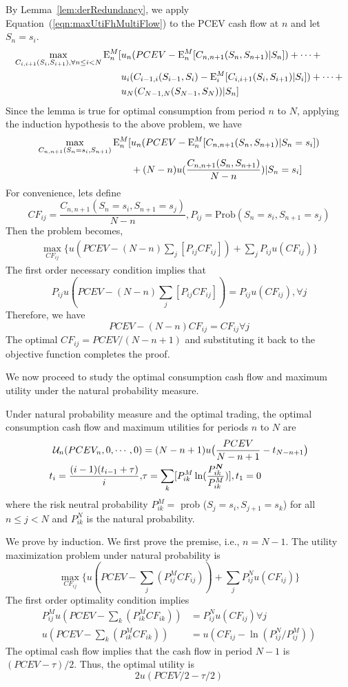 By Lemma~\ref{lem:derRedundancy}, we apply Equation~(\ref{eqn:maxUtiFhMultiFlow}) to the PCEV cash flow at $n$ and let $S_n = s_i$.
\begin{align*}
\max_{C_{i,i+1}(S_i,S_{i+1}), \forall n \leq i < N} \mathrm{E}_{n}^M[ &u_{n} (PCEV - \mathrm{E}_{n}^M[C_{n,n+1}(S_{n},S_{n+1})|S_{n}]) +\cdots+ \\
& u_i( C_{i-1,i}(S_{i-1},S_i) - \mathrm{E}_{i}^M[C_{i,i+1}(S_{i},S_{i+1})|S_i]) + \cdots +  \\
&u_N(C_{N-1,N}(S_{N-1},S_N))|S_n]
\end{align*}
Since the lemma is true for optimal consumption from period $n$ to $N$, applying the induction hypothesis to the above problem, we have
\begin{align*}
\max_{C_{n,n+1}(S_n=s_i,S_{n+1})} \mathrm{E}_{n}^M[ &u_{n} (PCEV - \mathrm{E}_{n}^M[C_{n,n+1}(S_{n},S_{n+1})|S_{n}=s_i]) \\& + (N-n) u(\frac{C_{n,n+1}(S_n,S_{n+1})}{N-n})|S_n=s_i]
\end{align*}
For convenience, lets define
\[ CF_{ij} = \frac{C_{n,n+1}(S_n=s_i,S_{n+1}=s_j)}{N-n}, P_{ij} = \text{Prob} (S_n=s_i,S_{n+1}=s_j)\]
Then the problem becomes,
\begin{align*}
\max_{CF_{ij}} \{u(PCEV-(N-n)\sum_{j} [P_{ij}CF_{ij}]) + \sum_{j} P_{ij}u(CF_{ij}) \}
\end{align*}
The first order necessary condition implies that
\[P_{ij} u(PCEV-(N-n)\sum_{j} [P_{ij}CF_{ij}]) = P_{ij}u(CF_{ij}), \forall j \]
Therefore, we have
\[PCEV - (N-n) CF_{ij} = CF_{ij} \forall j \]
The optimal $CF_{ij} = PCEV/(N-n+1)$ and substituting it back to the objective function completes the proof.
\endproof

We now proceed to study the optimal consumption cash flow and maximum utility under the natural probability measure. 

{\lemma Under natural probability measure and the optimal trading, the optimal consumption cash flow and maximum utilities for periods $n$ to $N$ are
\begin{align}
\mathcal{U}_n(PCEV_n, 0,\cdots, 0) &= (N-n+1) u\big{(}\frac{PCEV}{N-n+1} - t_{N-n+1}\big{)} \\
t_i = \frac{(i-1)(t_{i-1} + \tau)}{i}, &\tau = \sum_{k}[P_{ik}^M\ln(\frac{P_{ik}^{\bm{N}}}{P_{ik}^M})],  t_1 = 0 
\end{align}
where the risk neutral probability $P_{ik}^M =$ prob ($S_{j} = s_i, S_{j+1} = s_k$) for all $n\leq j < N$ and $P_{ik}^N$ is the natural probability.
}

\proof We prove by induction. We first prove the premise, i.e., $n = N-1$. The utility maximization problem under natural probability  is
\[ \max_{CF_{ij}} \{ u(PCEV- \sum_{j}(P_{ij}^MCF_{ij})) +\sum_{j}P^N_{ij}u(CF_{ij}) \}\]
The first order optimality condition implies
\begin{align*}
P_{ij}^Mu(PCEV- \sum_{k}(P_{ik}^M CF_{ik})) &= P_{ij}^N u(CF_{ij}) \forall j\\
u( PCEV- \sum_{k}(P_{ik}^M CF_{ik})) & = u(CF_{ij} - \ln(P_{ij}^N/P_{ij}^M)) 
\end{align*}
The optimal cash flow implies that the cash flow in period $N-1$ is $(PCEV - \tau)/2$. Thus, the optimal utility is
\[2u(PCEV/2 - \tau /2)\] 

